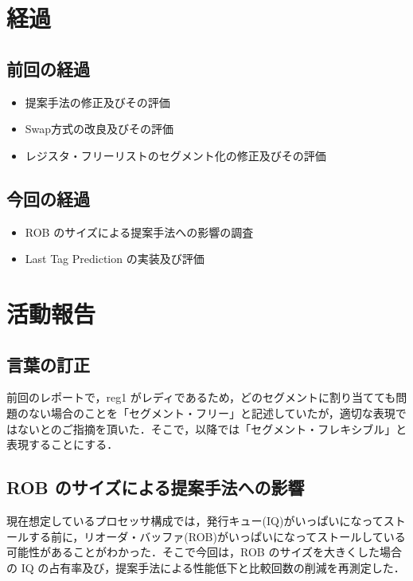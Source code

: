 \documentclass[twocolumn]{jsarticle}
\begin{document}
  \section{経過}

  \subsection{前回の経過}
  \begin{itemize}
    \item 提案手法の修正及びその評価
    \item Swap方式の改良及びその評価
    \item レジスタ・フリーリストのセグメント化の修正及びその評価
  \end{itemize}
  \subsection{今回の経過}
  \begin{itemize}
    \item ROB のサイズによる提案手法への影響の調査
    \item Last Tag Prediction の実装及び評価
  \end{itemize}

  

  \section{活動報告}
  \subsection{言葉の訂正}
  前回のレポートで，reg1 がレディであるため，どのセグメントに割り当てても問題のない場合のことを「セグメント・フリー」と記述していたが，適切な表現ではないとのご指摘を頂いた．そこで，以降では「セグメント・フレキシブル」と表現することにする．

  \subsection{ROB のサイズによる提案手法への影響}
  現在想定しているプロセッサ構成では，発行キュー(IQ)がいっぱいになってストールする前に，リオーダ・バッファ(ROB)がいっぱいになってストールしている可能性があることがわかった．そこで今回は，ROB のサイズを大きくした場合の IQ の占有率及び，提案手法による性能低下と比較回数の削減を再測定した．
\end{document}
